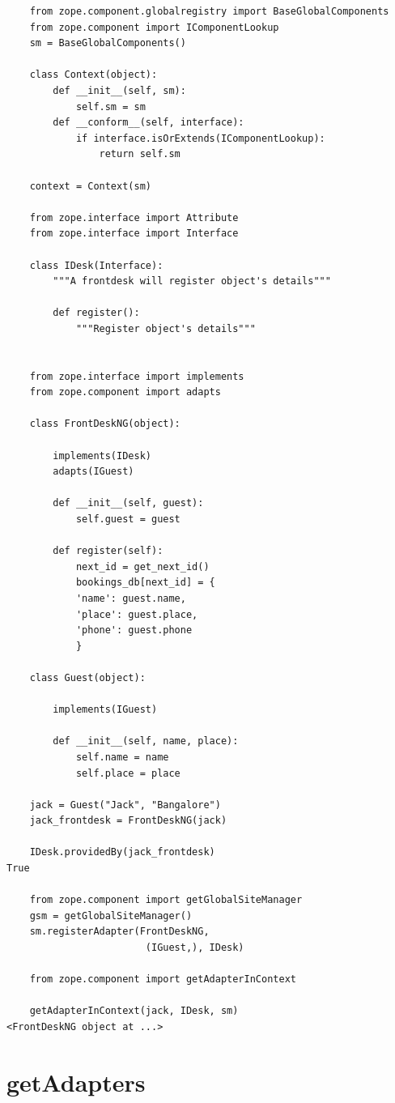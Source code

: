\documentclass[a4paper,openany,twoside,draft]{book}
\begin{document}
\begin{verbatim}
    from zope.component.globalregistry import BaseGlobalComponents
    from zope.component import IComponentLookup
    sm = BaseGlobalComponents()

    class Context(object):
        def __init__(self, sm):
            self.sm = sm
        def __conform__(self, interface):
            if interface.isOrExtends(IComponentLookup):
                return self.sm

    context = Context(sm)

    from zope.interface import Attribute
    from zope.interface import Interface

    class IDesk(Interface):
        """A frontdesk will register object's details"""

        def register():
            """Register object's details"""


    from zope.interface import implements
    from zope.component import adapts

    class FrontDeskNG(object):

        implements(IDesk)
        adapts(IGuest)

        def __init__(self, guest):
            self.guest = guest

        def register(self):
            next_id = get_next_id()
            bookings_db[next_id] = {
            'name': guest.name,
            'place': guest.place,
            'phone': guest.phone
            }

    class Guest(object):

        implements(IGuest)

        def __init__(self, name, place):
            self.name = name
            self.place = place

    jack = Guest("Jack", "Bangalore")
    jack_frontdesk = FrontDeskNG(jack)

    IDesk.providedBy(jack_frontdesk)
True

    from zope.component import getGlobalSiteManager
    gsm = getGlobalSiteManager()
    sm.registerAdapter(FrontDeskNG,
                        (IGuest,), IDesk)

    from zope.component import getAdapterInContext

    getAdapterInContext(jack, IDesk, sm)
<FrontDeskNG object at ...>
\end{verbatim}


\section*{getAdapters%
  \label{getadapters}%
}
\end{document}

